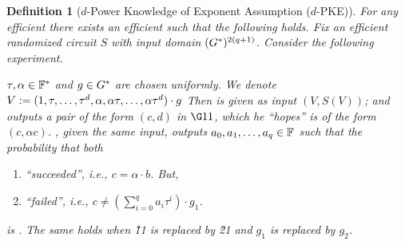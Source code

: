 \documentclass[11pt]{article}
\numberwithin{figure}{section} %
\newtheorem{dfn}[thm]{Definition}
\begin{document}
\begin{dfn}[$d$-Power Knowledge of Exponent Assumption ($d$-PKE)]\label{dfn:koeassumption}
For any efficient \adv there exists an efficient \ext such that the following holds.
Fix an efficient  randomized circuit $S$ with input domain $(G^*)^{2(q+1)}$.
 Consider the following experiment.

 $\tau,\alpha\in \mathbb F^*$ and $g\in G^*$ are chosen uniformly. We denote $V:= (1,\tau,\ldots,\tau^{d},\alpha,\alpha \tau,\ldots,\alpha \tau^{d})\cdot g$
 Then \adv is given as input $(V,S( V))$;
 and outputs a pair of the form $(c,d)$ in $\G11$, which he ``hopes'' is of the form $(c,\alpha c)$.
   \ext, given the same input, outputs  
 $a_0,a_1,\ldots,a_q \in \mathbb F$ such that the probability that both
   
 \begin{enumerate}
  \item \adv ``succeeded'', i.e., $c=\alpha\cdot b$. But,
  \item \ext ``failed'', i.e., $c \neq (\sum_{i=0}^q a_i \tau^i)\cdot g_1$.
   \end{enumerate}
is \neg.
 The same holds when \G11 is replaced by \G21 and $g_1$ is replaced by $g_2$.
\end{dfn}
\end{document}
